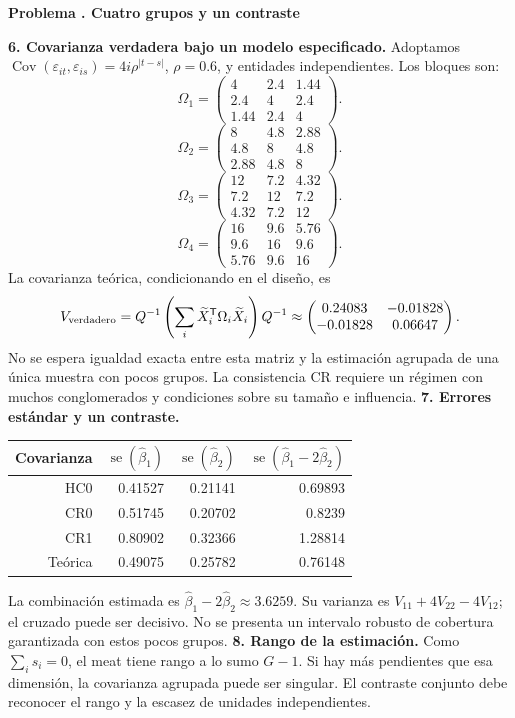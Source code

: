 \documentclass[11pt,a4paper]{article}
\newcommand{\T}{^{\mathsf T}}
\DeclareMathOperator{\Cov}{Cov}
\theoremstyle{definition}
\newcounter{problema}
\newenvironment{resuelto}[1]{\refstepcounter{problema}\par\medskip\Needspace{6\baselineskip}\textbf{Problema \theproblema. #1}\par}{\par\medskip}
\DeclareMathOperator{\se}{se}
\newcommand{\eps}{\varepsilon}
\begin{document}
\begin{resuelto}{Cuatro grupos y un contraste}
\textbf{6. Covarianza verdadera bajo un modelo especificado.} Adoptamos $\Cov(\eps_{it},\eps_{is})=4i\rho^{|t-s|}$, $\rho=0.6$, y entidades independientes. Los bloques son:
\[
\Omega_{1}=\begin{pmatrix}
4&2.4&1.44\\2.4&4&2.4\\1.44&2.4&4
\end{pmatrix}.
\]
\[
\Omega_{2}=\begin{pmatrix}
8&4.8&2.88\\4.8&8&4.8\\2.88&4.8&8
\end{pmatrix}.
\]
\[
\Omega_{3}=\begin{pmatrix}
12&7.2&4.32\\7.2&12&7.2\\4.32&7.2&12
\end{pmatrix}.
\]
\[
\Omega_{4}=\begin{pmatrix}
16&9.6&5.76\\9.6&16&9.6\\5.76&9.6&16
\end{pmatrix}.
\]
La covarianza teórica, condicionando en el diseño, es
\[
V_{\rm verdadero}=Q^{-1}\left(\sum_i\widetilde X_i\T\Omega_i\widetilde X_i\right)Q^{-1}\approx\begin{pmatrix}
0.24083&-0.01828\\-0.01828&0.06647
\end{pmatrix}.
\]
No se espera igualdad exacta entre esta matriz y la estimación agrupada de una única muestra con pocos grupos. La consistencia CR requiere un régimen con muchos conglomerados y condiciones sobre su tamaño e influencia.
\textbf{7. Errores estándar y un contraste.}

\begin{center}\small
\begin{tabular}{rrrr}
\toprule
Covarianza&$\se(\widehat\beta_1)$&$\se(\widehat\beta_2)$&$\se(\widehat\beta_1-2\widehat\beta_2)$\\
\midrule
HC0&0.41527&0.21141&0.69893\\
CR0&0.51745&0.20702&0.8239\\
CR1&0.80902&0.32366&1.28814\\
Teórica&0.49075&0.25782&0.76148\\
\bottomrule
\end{tabular}
\end{center}
La combinación estimada es $\widehat\beta_1-2\widehat\beta_2\approx3.6259$. Su varianza es $V_{11}+4V_{22}-4V_{12}$; el cruzado puede ser decisivo. No se presenta un intervalo robusto de cobertura garantizada con estos pocos grupos.
\textbf{8. Rango de la estimación.} Como $\sum_i s_i=0$, el meat tiene rango a lo sumo $G-1$. Si hay más pendientes que esa dimensión, la covarianza agrupada puede ser singular. El contraste conjunto debe reconocer el rango y la escasez de unidades independientes.
\end{resuelto}
\end{document}
